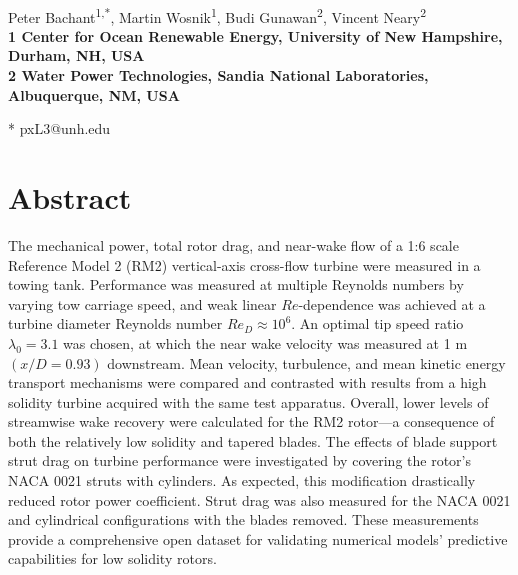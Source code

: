 \documentclass[10pt,letterpaper]{article}
\date{}
\begin{document}
\vspace*{0.35in}

\begin{flushleft}

{\Large \textbf{}}
\newline
\\
Peter Bachant\textsuperscript{1,*},
Martin Wosnik\textsuperscript{1},
Budi Gunawan\textsuperscript{2},
Vincent Neary\textsuperscript{2}
\\
\bigskip
\bf{1} Center for Ocean Renewable Energy, University of New Hampshire, Durham, NH,
USA
\\
\bf{2} Water Power Technologies, Sandia National Laboratories, Albuquerque, NM, USA
\\
\bigskip

* pxL3@unh.edu

\end{flushleft}

\section*{Abstract}

The mechanical power, total rotor drag, and near-wake flow of a 1:6 scale
Reference Model 2 (RM2) vertical-axis cross-flow turbine were measured in a
towing tank. Performance was measured at multiple Reynolds numbers by varying
tow carriage speed, and weak linear $Re$-dependence was achieved at a turbine
diameter Reynolds number $Re_D \approx 10^6$. An optimal tip speed ratio
$\lambda_0 = 3.1$ was chosen, at which the near wake velocity was measured at 1
m $(x/D=0.93)$ downstream. Mean velocity, turbulence, and mean kinetic energy
transport mechanisms were compared and contrasted with results from a high
solidity turbine acquired with the same test apparatus. Overall, lower levels of
streamwise wake recovery were calculated for the RM2 rotor---a consequence of
both the relatively low solidity and tapered blades. The effects of blade
support strut drag on turbine performance were investigated by covering the
rotor's NACA 0021 struts with cylinders. As expected, this modification
drastically reduced rotor power coefficient. Strut drag was also measured for
the NACA 0021 and cylindrical configurations with the blades removed. These
measurements provide a comprehensive open dataset for validating numerical
models' predictive capabilities for low solidity rotors.
\end{document}
